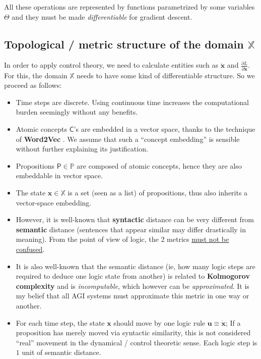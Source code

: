 \documentclass[orivec]{llncs}
\newcommand{\vect}[1]{\boldsymbol{#1}}
\begin{document}
All these operations are represented by functions parametrized by some variables $\Theta$ and they must be made \textit{differentiable} for gradient descent.

\subsection{Topological / metric structure of the domain $\mathbb{X}$}

In order to apply control theory, we need to calculate entities such as $\dot{\vect{x}}$ and $\displaystyle \frac{\partial L}{\partial \dot{\vect{x}}}$.  For this, the domain $\mathbb{X}$ needs to have some kind of differentiable structure.  So we proceed as follows:
\begin{itemize}
	\item Time steps are discrete.  Using continuous time increases the computational burden seemingly without any benefits.
	\item Atomic concepts $\mathsf{C}$'s are embedded in a vector space, thanks to the technique of \textbf{Word2Vec} \cite{Word2Vec}.  We assume that such a ``concept embedding'' is sensible without further explaining its justification.
	\item Propositions $\mathsf{P} \in \mathbb{P}$ are composed of atomic concepts, hence they are also embeddable in vector space.
	\item The state $\vect{x} \in \mathbb{X}$ is a set (seen as a list) of propositions, thus also inherits a vector-space embedding.
	\item However, it is well-known that \textbf{syntactic} distance can be very different from \textbf{semantic} distance (sentences that appear similar may differ drastically in meaning).  From the point of view of logic, the 2 metrics \uline{must not be confused}.
	\item It is also well-known that the semantic distance (ie, how many logic steps are required to deduce one logic state from another) is related to \textbf{Kolmogorov complexity} \cite{Li2008} and is \textit{incomputable}, which however can be \textit{approximated}.  It is my belief that all AGI systems must approximate this metric in one way or another.
	\item For each time step, the state $\vect{x}$ should move by one logic rule $\vect{u} \equiv \dot{\vect{x}}$; If a proposition has merely moved via syntactic similarity, this is not considered ``real'' movement in the dynamical / control theoretic sense.  Each logic step is $1$ unit of semantic distance.

\end{itemize}
\end{document}
